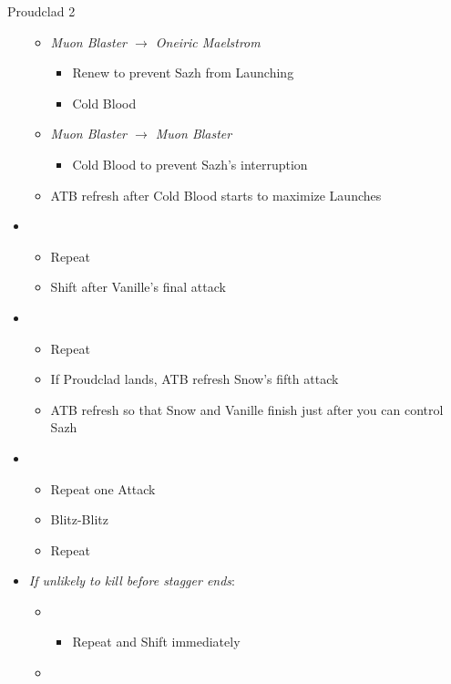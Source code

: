 \begin{battle}{Proudclad 2}
\begin{multicols}{2}
\begin{itemize}
\begin{itemize}
\begin{itemize}
        \end{itemize}
        \item \textit{Muon Blaster $\rightarrow$ Oneiric Maelstrom}
        \begin{itemize}
            \item Renew to prevent Sazh from Launching
            \item Cold Blood
        \end{itemize}
        \item \textit{Muon Blaster $\rightarrow$ Muon Blaster}
        \begin{itemize}
            \item Cold Blood to prevent Sazh's interruption
        \end{itemize}
        \item ATB refresh after Cold Blood starts to maximize Launches
    \end{itemize}
    \item \fifth
    \begin{itemize}
        \item Repeat
        \item Shift after Vanille's final attack
    \end{itemize}
    \item \first
    \begin{itemize}
        \item Repeat
        \item If Proudclad lands, ATB refresh Snow's fifth attack
        \item ATB refresh so that Snow and Vanille finish just after you can control Sazh
    \end{itemize}
    \item \second
    \begin{itemize}
        \item Repeat one Attack
        \item Blitz-Blitz
        \item Repeat
    \end{itemize}
    \columnbreak
    \item \textit{If unlikely to kill before stagger ends}:
    \begin{itemize}
        \item \first
        \begin{itemize}
            \item Repeat and Shift immediately
        \end{itemize}
        \item \second

\end{itemize}
\end{itemize}
\end{multicols}
\end{battle}
